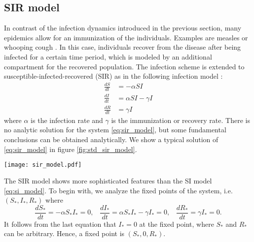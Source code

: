 \documentclass[openright,twoside,headsepline]{scrbook}
\begin{document}
\subsection{SIR model}\label{sec:sir_model}
In contrast of the infection dynamics introduced in the previous section, many epidemics allow for an immunization of the individuals.
Examples are measles or whooping cough \citep{grenfell:92} \citep{andersonmay:92}.
In this case, individuals recover from the disease after being infected for a certain time period, which is modeled by an additional compartment for the recovered population.
The infection scheme is extended to susceptible-infected-recovered (SIR) as in the following infection model \citep{kermack:27}:
\begin{align}\label{eq:sir_model}
\frac{dS}{dt} &= -\alpha SI \nonumber \\
\frac{dI}{dt} &= \alpha SI -\gamma I \nonumber \\
\frac{dR}{dt} &= \gamma I
\end{align}
where $\alpha $ is the infection rate and $\gamma $ is the immunization or recovery rate.
There is no analytic solution for the system \eqref{eq:sir_model}, but some fundamental conclusions can be obtained analytically.
We show a typical solution of \eqref{eq:sir_model} in figure \ref{fig:std_sir_model}.
%
\begin{SCfigure}%
\texttt{[image: sir\_model.pdf]}
\caption{Solution of the susceptible-infected-recovered (SIR) model \eqref{eq:sir_model}.
The number of infected shows that the spreading process is a single event.
Note that a fraction of the population is still susceptible at the end of the process.
Parameters: $\alpha = 3$, $\gamma = 1$, $N=300$, $S_0=1$.}
\label{fig:std_sir_model}
\end{SCfigure}
%


The SIR model shows more sophisticated features than the SI model \eqref{eq:si_model}.
To begin with, we analyze the fixed points of the system, i.e. $(S_*,I_*,R_*)$ where
\begin{equation}
\frac{dS_*}{dt} = -\alpha S_*I_* =0 ,\; \;\;
\frac{dI_*}{dt} = \alpha S_*I_* -\gamma I_* =0,\; \;\;
\frac{dR_*}{dt} = \gamma I_* = 0.
\end{equation}
It follows from the last equation that $I_*=0$ at the fixed point, where $S_*$ and $R_*$ can be arbitrary.
Hence, a fixed point is $(S_*,0,R_*)$.
\end{document}
